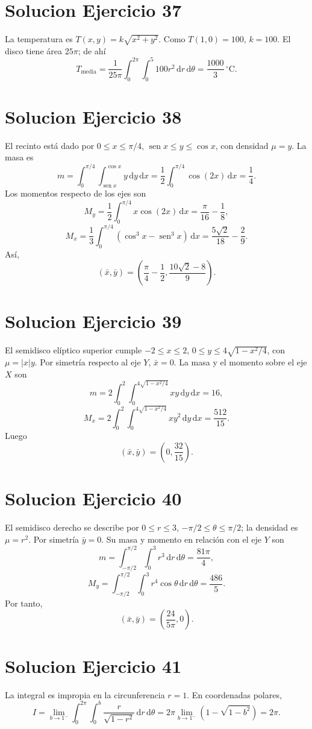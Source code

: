\documentclass[11pt,a4paper]{article}
\DeclareMathOperator{\sen}{sen}
\newcommand{\dd}{\,\mathrm{d}}
\begin{document}
\section{Solucion Ejercicio 37}
La temperatura es $T(x,y)=k\sqrt{x^2+y^2}$. Como $T(1,0)=100$, $k=100$. El disco tiene área $25\pi$; de ahí
\[T_{\text{media}}=\frac1{25\pi}\int_0^{2\pi}\int_0^5 100r^2\dd r\dd\theta=\boxed{\frac{1000}{3}\,{}^\circ\mathrm C}.\]

\section{Solucion Ejercicio 38}
El recinto está dado por $0\le x\le\pi/4$, $\sen x\le y\le\cos x$, con densidad $\mu=y$. La masa es
\[m=\int_0^{\pi/4}\int_{\sen x}^{\cos x}y\dd y\dd x=\frac12\int_0^{\pi/4}\cos(2x)\dd x=\frac14.\]
Los momentos respecto de los ejes son
\[M_y=\frac12\int_0^{\pi/4}x\cos(2x)\dd x=\frac\pi{16}-\frac18,\]
\[M_x=\frac13\int_0^{\pi/4}(\cos^3x-\sen^3x)\dd x=\frac{5\sqrt2}{18}-\frac29.\]
Así,
\[\boxed{(\bar x,\bar y)=\left(\frac\pi4-\frac12,\frac{10\sqrt2-8}{9}\right)}.\]

\section{Solucion Ejercicio 39}
El semidisco elíptico superior cumple $-2\le x\le2$, $0\le y\le4\sqrt{1-x^2/4}$, con $\mu=|x|y$. Por simetría respecto al eje $Y$, $\bar x=0$. La masa y el momento sobre el eje $X$ son
\[m=2\int_0^2\int_0^{4\sqrt{1-x^2/4}}xy\dd y\dd x=16,\]
\[M_x=2\int_0^2\int_0^{4\sqrt{1-x^2/4}}xy^2\dd y\dd x=\frac{512}{15}.\]
Luego
\[\boxed{(\bar x,\bar y)=\left(0,\frac{32}{15}\right)}.\]

\section{Solucion Ejercicio 40}
El semidisco derecho se describe por $0\le r\le3$, $-\pi/2\le\theta\le\pi/2$; la densidad es $\mu=r^2$. Por simetría $\bar y=0$. Su masa y momento en relación con el eje $Y$ son
\[m=\int_{-\pi/2}^{\pi/2}\int_0^3r^3\dd r\dd\theta=\frac{81\pi}{4},\]
\[M_y=\int_{-\pi/2}^{\pi/2}\int_0^3r^4\cos\theta\dd r\dd\theta=\frac{486}{5}.\]
Por tanto,
\[\boxed{(\bar x,\bar y)=\left(\frac{24}{5\pi},0\right)}.\]

\section{Solucion Ejercicio 41}
La integral es impropia en la circunferencia $r=1$. En coordenadas polares,
\[I=\lim_{b\to1^-}\int_0^{2\pi}\int_0^b\frac{r}{\sqrt{1-r^2}}\dd r\dd\theta=2\pi\lim_{b\to1^-}\left(1-\sqrt{1-b^2}\right)=\boxed{2\pi}.\]
\end{document}

